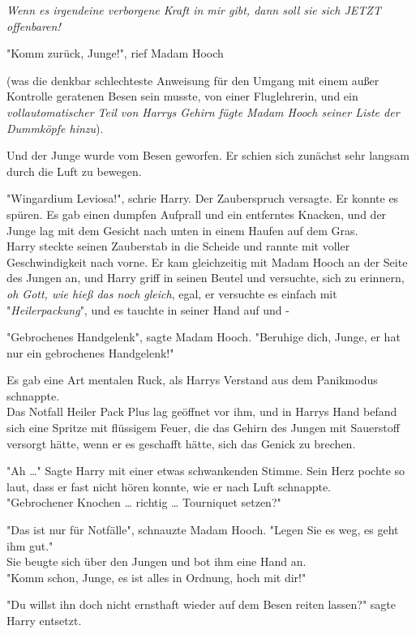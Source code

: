 {\emph{Wenn es irgendeine verborgene Kraft in mir gibt, dann soll sie sich JETZT offenbaren!}

"Komm zurück, Junge!", rief Madam Hooch

(was die denkbar schlechteste Anweisung für den Umgang mit einem außer Kontrolle geratenen Besen sein musste, von einer Fluglehrerin, und ein \emph{vollautomatischer Teil von Harrys Gehirn fügte Madam Hooch seiner Liste der Dummköpfe hinzu}).

Und der Junge wurde vom Besen geworfen. Er schien sich zunächst sehr langsam durch die Luft zu bewegen.

"Wingardium Leviosa!", schrie Harry. Der Zauberspruch versagte. Er konnte es spüren. Es gab einen dumpfen Aufprall und ein entferntes Knacken, und der Junge lag mit dem Gesicht nach unten in einem Haufen auf dem Gras.\\ Harry steckte seinen Zauberstab in die Scheide und rannte mit voller Geschwindigkeit nach vorne. Er kam gleichzeitig mit Madam Hooch an der Seite des Jungen an, und Harry griff in seinen Beutel und versuchte, sich zu erinnern, \emph{oh Gott, wie hieß das noch gleich}, egal, er versuchte es einfach mit\\ "\emph{Heilerpackung}", und es tauchte in seiner Hand auf und -

"Gebrochenes Handgelenk", sagte Madam Hooch. "Beruhige dich, Junge, er hat nur ein gebrochenes Handgelenk!"

Es gab eine Art mentalen Ruck, als Harrys Verstand aus dem Panikmodus schnappte.\\ Das Notfall Heiler Pack Plus lag geöffnet vor ihm, und in Harrys Hand befand sich eine Spritze mit flüssigem Feuer, die das Gehirn des Jungen mit Sauerstoff versorgt hätte, wenn er es geschafft hätte, sich das Genick zu brechen.

"Ah …" Sagte Harry mit einer etwas schwankenden Stimme. Sein Herz pochte so laut, dass er fast nicht hören konnte, wie er nach Luft schnappte.\\ "Gebrochener Knochen … richtig … Tourniquet setzen?"

"Das ist nur für Notfälle", schnauzte Madam Hooch. "Legen Sie es weg, es geht ihm gut."\\ Sie beugte sich über den Jungen und bot ihm eine Hand an.\\ "Komm schon, Junge, es ist alles in Ordnung, hoch mit dir!"

"Du willst ihn doch nicht ernsthaft wieder auf dem Besen reiten lassen?" sagte Harry entsetzt.

}
